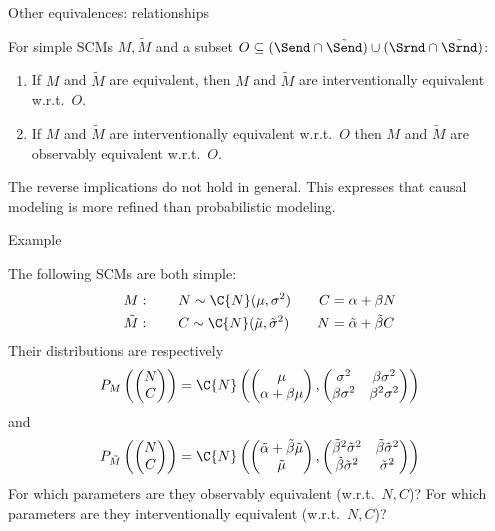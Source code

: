 \begin{frame}{Other equivalences: relationships}
  \begin{Prp}[\ref{prp:pearls_ladder_levels_1_and_2}]
  For simple SCMs $M, \tilde{M}$ and a subset $O \subseteq (\Send \cap \tilde{\Send}) \cup (\Srnd \cap \tilde{\Srnd})$:
  \begin{enumerate}
    \item If $M$ and $\tilde{M}$ are equivalent, then 
      $M$ and $\tilde{M}$ are interventionally equivalent w.r.t.\ $O$.
    \item If $M$ and $\tilde{M}$ are interventionally equivalent w.r.t.\ $O$ then 
      $M$ and $\tilde{M}$ are observably equivalent w.r.t.\ $O$.
  \end{enumerate}
\end{Prp}
The reverse implications do not hold in general. This expresses that causal modeling is more refined than probabilistic modeling.
\end{frame}

\begin{frame}{Example}
\begin{Eg}
  The following SCMs are both simple:
  \begin{align*}
    M &: \qquad N \sim \C{N}(\mu,\sigma^2) \qquad C = \alpha + \beta N \\
    \tilde{M}&: \qquad C \sim \C{N}(\tilde{\mu},\tilde{\sigma}^2) \qquad N = \tilde{\alpha} + \tilde{\beta} C
  \end{align*}
Their distributions are respectively 
  $$P_M\left(\begin{pmatrix}N \\C\end{pmatrix}\right) = \C{N}\left(\begin{pmatrix} \mu \\ \alpha + \beta \mu \end{pmatrix}, \begin{pmatrix} \sigma^2 & \beta\sigma^2 \\ \beta\sigma^2 & \beta^2\sigma^2\end{pmatrix}\right)$$
and
  $$P_{\tilde{M}}\left(\begin{pmatrix}N\\C\end{pmatrix}\right) = \C{N}\left(\begin{pmatrix} \tilde{\alpha} + \tilde{\beta}\tilde{\mu} \\ \tilde{\mu} \end{pmatrix}, \begin{pmatrix} \tilde{\beta}^2\tilde{\sigma}^2 & \tilde{\beta}\tilde{\sigma}^2 \\ \tilde{\beta}\tilde{\sigma}^2 & \tilde{\sigma}^2\end{pmatrix}\right)$$
For which parameters are they observably equivalent (w.r.t.\ $N,C$)?
For which parameters are they interventionally equivalent (w.r.t.\ $N,C$)?
\end{Eg}
\end{frame}

